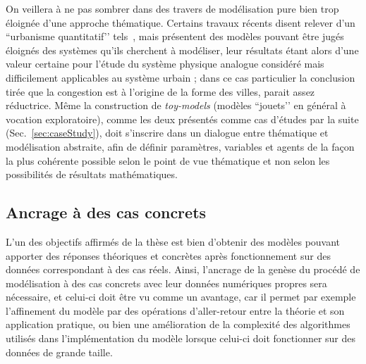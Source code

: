 \documentclass[french,12pt]{article}
\begin{document}
\bigskip

On veillera à ne pas sombrer dans des travers de modélisation pure bien trop éloignée d’une approche thématique. Certains travaux récents %
disent relever d’un ``urbanisme quantitatif’’ tels~\cite{2013PhRvL.111s8702L}, mais présentent des modèles pouvant être jugés éloignés des systèmes qu’ils cherchent à modéliser, leur résultats étant alors d’une valeur certaine pour l’étude du système physique analogue considéré mais difficilement applicables au système urbain ; dans ce cas particulier la conclusion tirée que la congestion est à l’origine de la forme des villes, parait assez réductrice. Même la construction de \emph{toy-models} (modèles ``jouets’’ en général à vocation exploratoire), comme les deux présentés comme cas d’études par la suite (Sec.~\ref{sec:caseStudy}), doit s’inscrire dans un dialogue entre thématique et modélisation abstraite, afin de définir paramètres, variables et agents de la façon la plus cohérente possible selon le point de vue thématique et non selon les possibilités de résultats mathématiques.

\subsection{Ancrage à des cas concrets}

L'un des objectifs affirmés de la thèse est bien d'obtenir des modèles pouvant apporter des réponses théoriques et concrètes après fonctionnement sur des données correspondant à des cas réels. Ainsi, l'ancrage de la genèse du procédé de modélisation à des cas concrets avec leur données numériques propres sera nécessaire, et celui-ci doit être vu comme un avantage, car il permet par exemple l'affinement du modèle par des opérations d'aller-retour entre la théorie et son application pratique, ou bien une amélioration de la complexité des algorithmes utilisés dans l'implémentation du modèle lorsque celui-ci doit fonctionner sur des données de grande taille.

\bigskip
\end{document}
